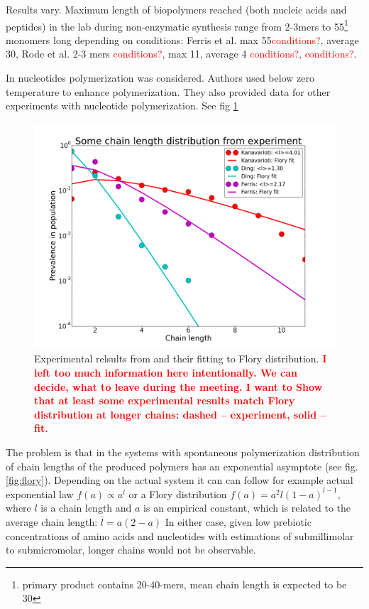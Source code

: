 \documentclass[twoside,twocolumn,9pt]{article}
\newcommand{\red}[1]{\textcolor{red}{#1}}
\begin{document}
Results vary. Maximum length of biopolymers reached (both nucleic acids and peptides) in the lab 
during non-enzymatic synthesis range from 2-3mers to 
55\footnote{primary product contains 20-40-mers, mean chain length is expected to be 
30\cite{Ferris1996}} monomers long depending on conditions: 
Ferris et al. max 55\red{conditions?}, average 30\cite{Ferris1996}, Rode et al. 2-3 mers
\cite{Rode1999}\red{conditions?}, max 11, average 4 \cite{Kanavarioti2001}\red{conditions?}, 
\cite{Leman2004a}\red{conditions?}. 

In \cite{Kanavarioti2001} nucleotides polymerization was considered. Authors used below zero temperature to enhance polymerization. They also provided data for other experiments with nucleotide polymerization. See fig \ref{fig:some_flory}
\begin{figure}[h!]
  \centering
  \includegraphics[width=\columnwidth]{pictures/some_flory.png} 
  \caption{Experimental relsults from \cite{Kanavarioti2001} and their fitting to Flory 
distribution. \red{\textbf{I left too much information here intentionally. We can decide, 
what to leave during the meeting. I want to Show that at least some experimental results match 
Flory distribution at longer chains: dashed -- experiment, solid -- fit.}}}
  \label{fig:some_flory}
\end{figure}


The problem is that in the systems with spontaneous polymerization distribution of chain lengths 
of the produced polymers has an exponential asymptote  (see fig. \ref{fig:flory}). Depending on the 
actual system it can can follow for example actual exponential 
law  $f(a)\propto a^l$\cite{nowak2008prevolutionary,Derr2012} or a Flory distribution 
$f(a)=a^2l(1-a)^{l-1}$\cite{Flory1953}, where $l$ is a chain length and $a$ is an empirical 
constant, which is related to the average chain length: $\bar l = a(2- a)$
In either case, given low prebiotic concentrations of amino acids and nucleotides with estimations 
of submillimolar to submicromolar\cite{Aubrey2009,Kanavarioti2001,Lazcano1996}, longer chains 
would not be observable.
\end{document}
